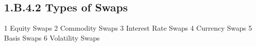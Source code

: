 \subsection*{1.B.4.2 Types of Swaps}

1 Equity Swaps
2 Commodity Swaps
3 Interest Rate Swaps
4 Currency Swaps
5 Basis Swaps
6 Volatility Swaps



